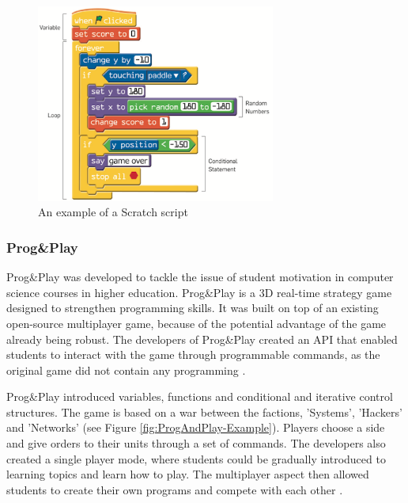 \documentclass[a4paper,11.5pt]{report}
\numberwithin{figure}{section}
\numberwithin{table}{section}
\numberwithin{equation}{section}
\numberwithin{equation}{section}
\begin{document}


\begin{figure}[H]
 \centering
    \includegraphics[width=0.7\textwidth]{Scratch-Example}
       \captionsetup{justification=centering}
\caption{An example of a Scratch script  {\citep{resnick2009}}}
\label{fig:Scratch-Example}
\end{figure}

\subsubsection*{Prog\&Play}

Prog\&Play was developed to tackle the issue of student motivation in computer science courses in higher education. Prog\&Play is a 3D real-time strategy game designed to strengthen programming skills. It was built on top of an existing open-source multiplayer game, because of the potential advantage of the game already being robust. The developers of Prog\&Play created an API that enabled students to interact with the game through programmable commands, as the original game did not contain any programming \citep{muratet2011}.

Prog\&Play introduced variables, functions and conditional and iterative control structures. The game is based on a war between the factions, 'Systems', 'Hackers' and 'Networks' (see Figure \ref{fig:ProgAndPlay-Example}). Players choose a side and give orders to their units through a set of commands. The developers also created a single player mode, where students could be gradually introduced to learning topics and learn how to play. The multiplayer aspect then allowed students to create their own programs and compete with each other \citep{muratet2011}.
\end{document}
